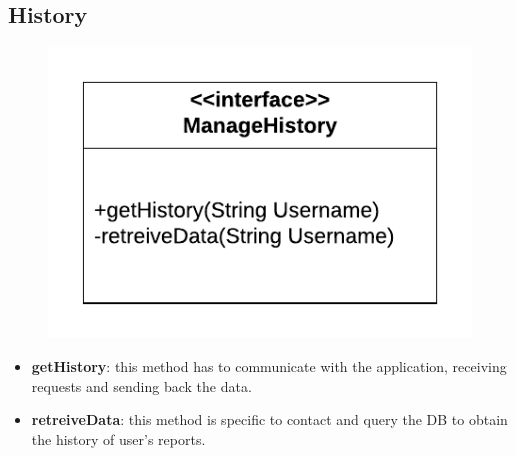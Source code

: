 \documentclass[12pt,a4paper]{report}
\begin{document}
			\subsection{History}
				\begin{figure}[H]
						\includegraphics[center]{historyInterface}
						\label{fig: interfaces}
				\end{figure}
				\begin{itemize}
					\item \textbf{getHistory}: this method has to communicate with the application, receiving requests and
						sending back the data.
					\item \textbf{retreiveData}: this method is specific to contact and query the DB to obtain the history of
						user's reports. 
				\end{itemize}
\end{document}
